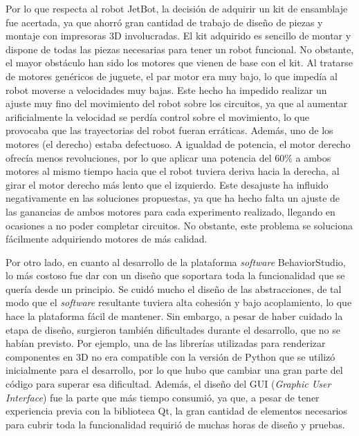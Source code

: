 Por lo que respecta al robot JetBot, la decisión de adquirir un kit de ensamblaje fue acertada, ya que ahorró gran cantidad de trabajo de diseño de piezas y montaje con impresoras 3D involucradas. El kit adquirido es sencillo de montar y dispone de todas las piezas necesarias para tener un robot funcional. No obstante, el mayor obstáculo han sido los motores que vienen de base con el kit. Al tratarse de motores genéricos de juguete, el par motor era muy bajo, lo que impedía al robot moverse a velocidades muy bajas. Este hecho ha impedido realizar un ajuste muy fino del movimiento del robot sobre los circuitos, ya que al aumentar arificialmente la velocidad se perdía control sobre el movimiento, lo que provocaba que las trayectorias del robot fueran erráticas. Además, uno de los motores (el derecho) estaba defectuoso. A igualdad de potencia, el motor derecho ofrecía menos revoluciones, por lo que aplicar una potencia del 60\% a ambos motores al mismo tiempo hacia que el robot tuviera deriva hacia la derecha, al girar el motor derecho más lento que el izquierdo. Este desajuste ha influido negativamente en las soluciones propuestas, ya que ha hecho falta un ajuste de las ganancias de ambos motores para cada experimento realizado, llegando en ocasiones a no poder completar circuitos. No obstante, este problema se soluciona fácilmente adquiriendo motores de más calidad.

Por otro lado, en cuanto al desarrollo de la plataforma \textit{software} BehaviorStudio, lo más costoso fue dar con un diseño que soportara toda la funcionalidad que se quería desde un principio. Se cuidó mucho el diseño de las abstracciones, de tal modo que el \textit{software} resultante tuviera alta cohesión y bajo acoplamiento, lo que hace la plataforma fácil de mantener. Sin embargo, a pesar de haber cuidado la etapa de diseño, surgieron también dificultades durante el desarrollo, que no se habían previsto. Por ejemplo, una de las librerías utilizadas para renderizar componentes en 3D no era compatible con la versión de Python que se utilizó inicialmente para el desarrollo, por lo que hubo que cambiar una gran parte del código para superar esa dificultad. Además, el diseño del GUI (\textit{Graphic User Interface}) fue la parte que más tiempo consumió, ya que, a pesar de tener experiencia previa con la biblioteca Qt, la gran cantidad de elementos necesarios para cubrir toda la funcionalidad requirió de muchas horas de diseño y pruebas.


